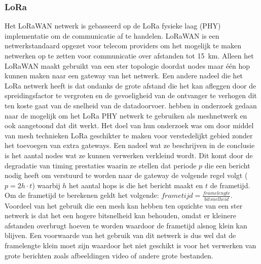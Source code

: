 \documentclass[a4paper, 11pt, oneside]{report}
\begin{document}
\subsubsection{LoRa}
Het LoRaWAN netwerk is gebasseerd op de LoRa fysieke laag (PHY)\cite{LoRAMOD} implementatie om de communicatie af te handelen.
LoRaWAN is een netwerkstandaard opgezet voor telecom providers om het mogelijk te maken netwerken op te zetten voor communicatie over afstanden tot \SI{15}{\kilo\meter}.
Alleen het LoRaWAN maakt gebruikt van een ster topologie doordat nodes maar één hop kunnen maken naar een gateway van het netwerk.
Een andere nadeel die het LoRa netwerk heeft is dat ondanks de grote afstand die het kan afleggen door de spreidingsfactor te vergroten en de gevoeligheid van de ontvanger te verhogen dit ten koste gaat van de snelheid van de datadoorvoer.
 hebben in onderzoek gedaan naar de mogelijk om het LoRa PHY netwerk te gebruiken als meshnetwerk en ook aangetoond dat dit werkt.
Het doel van hun onderzoek was om door middel van mesh technieken LoRa geschikter te maken voor verstedelijkt gebied zonder het toevoegen van extra gateways. 
Een nadeel wat ze beschrijven in de conclusie is het aantal nodes wat ze kunnen verwerken verkleind wordt.
Dit komt door de degradatie van timing prestaties waarin ze stellen dat periode $p$ die een bericht nodig heeft om verstuurd te worden naar de gateway de volgende regel volgt ($p = 2h\cdot t$) waarbij $h$ het aantal hops is die het bericht maakt en $t$ de frametijd. Om de frametijd te berekenen geldt het volgende: $frametijd = \frac{framelengte}{bitsnelheid}$. 
Voordeel van het gebruik die een mesh kan hebben ten opzichte van een ster netwerk is dat het een hogere bitsnelheid kan behouden, omdat er kleinere afstanden overbrugt hoeven te worden waardoor de frametijd alsnog klein kan blijven.
Een voorwaarde van het gebruik van dit netwerk is dus wel dat de framelengte klein moet zijn waardoor het niet geschikt is voor het verwerken van grote berichten zoals afbeeldingen video of andere grote bestanden.
\end{document}
